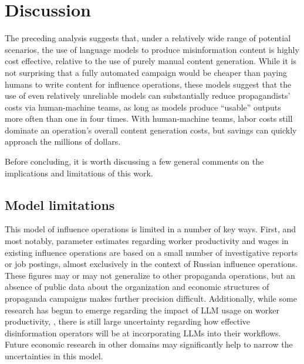\documentclass{article}
\begin{document}
\section{Discussion}
\label{sec:discussion}

The preceding analysis suggests that, under a relatively wide range of potential scenarios, the use of language models to produce misinformation content is highly cost effective, relative to the use of purely manual content generation. While it is not surprising that a fully automated campaign would be cheaper than paying humans to write content for influence operations, these models suggest that the use of even relatively unreliable models can substantially reduce propagandists' costs via human-machine teams, as long as models produce ``usable'' outputs more often than one in four times. With human-machine teams, labor costs still dominate an operation's overall content generation costs, but savings can quickly approach the millions of dollars. 

Before concluding, it is worth discussing a few general comments on the implications and limitations of this work.

\subsection{Model limitations}

This model of influence operations is limited in a number of key ways. First, and most notably, parameter estimates regarding worker productivity and wages in existing influence operations are based on a small number of investigative reports or job postings, almost exclusively in the context of Russian influence operations. These figures may or may not generalize to other propaganda operations, but an absence of public data about the organization and economic structures of propaganda campaigns makes further precision difficult. Additionally, while some research has begun to emerge regarding the impact of LLM usage on worker productivity, \cite{brynjolfsson, gptsasgpts, codemodels, googleproductivity}, there is still large uncertainty regarding how effective disinformation operators will be at incorporating LLMs into their workflows. Future economic research in other domains may significantly help to narrow the uncertainties in this model.  
\end{document}
